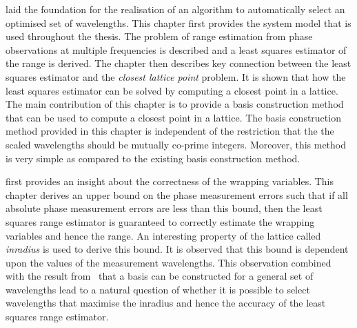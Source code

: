  laid the foundation for the realisation of an algorithm to automatically select an optimised set of wavelengths. This chapter first provides the system model that is used throughout the thesis. The problem of range estimation from phase observations at multiple frequencies is described and a least squares estimator of the range is derived. The chapter then describes key connection between the least squares estimator and the \emph{closest lattice point} problem. It is shown that how the least squares estimator can be solved by computing a closest point in a lattice. The main contribution of this chapter is to provide a basis construction method that can be used to compute a closest point in a lattice. The basis construction method provided in this chapter is independent of the restriction that the the scaled wavelengths should be mutually co-prime integers. Moreover, this method is very simple as compared to the existing basis construction method. 

 first provides an insight about the correctness of the wrapping variables. This chapter derives an upper bound on the phase measurement errors such that if all absolute phase measurement errors are less than this bound, then the least squares range estimator is guaranteed to correctly estimate the wrapping variables and hence the range. An interesting property of the lattice called \emph{inradius} is used to derive this bound. It is observed that this bound is dependent upon the values of the measurement wavelengths. This observation combined with the result from~ that a basis can be constructed for a general set of wavelengths lead to a natural question of whether it is possible to select wavelengths that maximise the inradius and hence the accuracy of the least squares range estimator.

